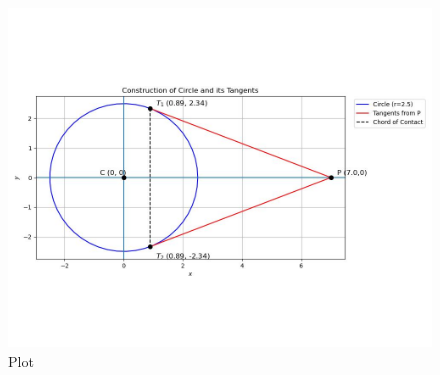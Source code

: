 \documentclass[journal]{IEEEtran}
\begin{document}
\begin{figure}[h!]
    \centering
    \includegraphics[width=\columnwidth]{figs/plot_c.jpg}
    \caption*{Plot}
    \label{fig:fig}
\end{figure}
\end{document}
